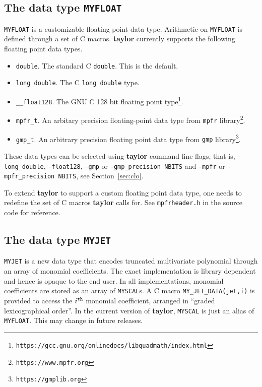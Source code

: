 \documentclass[10pt]{article}
\theoremstyle{remark}
\newcommand{\taylorname}{{\bf taylor}}
\newcommand{\myfloat}{{\tt MY\symbol{95}FLOAT}}
\newcommand{\myjet}{{\tt MY\symbol{95}JET}}
\newcommand{\myscal}{{\tt MY\symbol{95}SCAL}}
\begin{document}
\subsection{The data type \myfloat{}} \label{sec:myfloat}

\myfloat{} is a customizable floating point data type.  Arithmetic on
\myfloat{} is defined through a set of C macros. \taylorname{}
currently supports the following floating point data types.
\begin{itemize}
    \item \verb+double+.  The standard C \verb+double+.  This is the
      default.
    \item \verb+long double+. The C \verb+long double+ type.
    \item \verb+__float128+. The GNU C 128 bit floating point
      type\footnote{\texttt{https://gcc.gnu.org/onlinedocs/libquadmath/index.html}}.
    \item \verb+mpfr_t+. An arbitary precision floating-point data
      type from {\tt mpfr}
      library\footnote{\texttt{https://www.mpfr.org}}.
    \item \verb+gmp_t+. An arbitrary precision floating point data
      type from {\tt gmp}
      library\footnote{\texttt{https://gmplib.org}}.
\end{itemize}
These data types can be selected using \taylorname{} command line
flags, that is, \verb+-long_double+, \verb+-float128+, \verb+-gmp+ or
\verb+-gmp_precision NBITS+ and \verb+-mpfr+ or
\verb+-mpfr_precision NBITS+, see Section~\ref{sec:clo}.

\bigskip
To extend \taylorname{} to support a custom floating point data type,
one needs to redefine the set of C macros \taylorname{} calls for. See
{\tt{mpfrheader.h}} in the source code for reference.


\subsection{The data type \myjet{}} \label{sec:myjet}
\myjet{} is a new data type that encodes truncated multivariate
polynomial through an array of monomial coefficients. The exact
implementation is library dependent and hence is opaque to the end
user. In all implementations, monomial coefficients are stored as an
array of \myscal{}s. A C macro \verb+MY_JET_DATA(jet,i)+ is provided
to access the $i^{{\tt th}}$ monomial coefficient, arranged in
``graded lexicographical order''.  In the current version of
\taylorname{}, \myscal{} is just an alias of \myfloat{}. This may
change in future releases.
\end{document}
